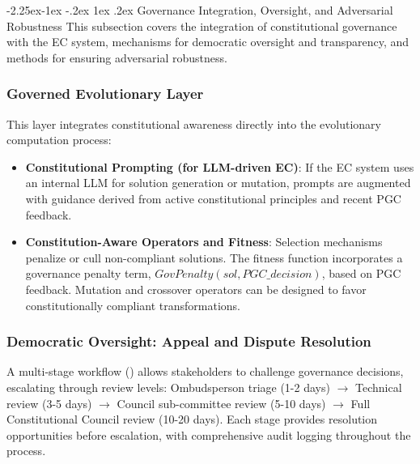 \documentclass[manuscript,screen,review,anonymous,9pt]{acmart}
\makeatletter
\renewcommand\subsection{\@startsection{subsection}{2}{\z@}%
  {-2.25ex\@plus -1ex \@minus -.2ex}%
  {1ex \@plus .2ex}%
  {\normalfont\large\bfseries}}
\makeatother
\begin{document}
\subsection{Governance Integration, Oversight, and Adversarial Robustness}
\label{subsec:governance_integration}
This subsection covers the integration of constitutional governance with the EC system, mechanisms for democratic oversight and transparency, and methods for ensuring adversarial robustness.

\subsubsection{Governed Evolutionary Layer}
\label{subsubsec:governed_evolutionary_layer}
This layer integrates constitutional awareness directly into the evolutionary computation process:
\begin{itemize}[leftmargin=*,itemsep=1pt,parsep=1pt]
    \item \textbf{Constitutional Prompting (for LLM-driven EC)}: If the EC system uses an internal LLM for solution generation or mutation, prompts are augmented with guidance derived from active constitutional principles and recent PGC feedback.
    \item \textbf{Constitution-Aware Operators and Fitness}: Selection mechanisms penalize or cull non-compliant solutions. The fitness function incorporates a governance penalty term, $GovPenalty(sol, PGC\_decision)$, based on PGC feedback. Mutation and crossover operators can be designed to favor constitutionally compliant transformations.
\end{itemize}

\subsubsection{Democratic Oversight: Appeal and Dispute Resolution}
\label{subsubsec:democratic_appeal}
A multi-stage workflow () allows stakeholders to challenge governance decisions, escalating through review levels: Ombudsperson triage (1-2 days) $\rightarrow$ Technical review (3-5 days) $\rightarrow$ Council sub-committee review (5-10 days) $\rightarrow$ Full Constitutional Council review (10-20 days). Each stage provides resolution opportunities before escalation, with comprehensive audit logging throughout the process.
\end{document}
